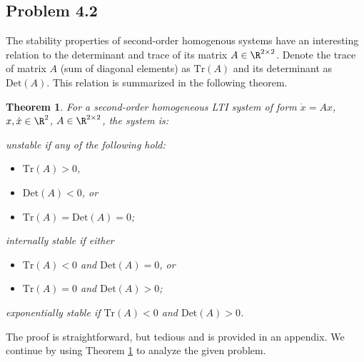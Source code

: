 \documentclass{homework}
\begin{document}
\subsection{Problem 4.2}

\newtheorem{theorem}{Theorem}
\newcommand{\Tr}{\text{Tr}(A)}
\newcommand{\Det}{\text{Det}(A)}

The stability properties of second-order homogenous systems have an interesting
relation to the determinant and trace of its matrix $A\in\R^{2\times 2}$.
Denote the trace of matrix $A$ (sum of diagonal elements) as $\Tr$ and its
determinant as $\Det$. This relation is summarized in the following theorem.

\begin{theorem}
    For a second-order homogeneous LTI system of form $\dot{x} = Ax$,
    $x,\dot{x}\in\R^2$, $A \in \R^{2\times 2}$, the system is:
    \begin{letterenum}
        \item \emph{unstable} if any of the following hold:
        \begin{itemize}
            \item $\Tr > 0$,
            \item $\Det < 0$, or
            \item $\Tr = \Det = 0$;
        \end{itemize}
        \item \emph{internally stable} if either
        \begin{itemize}
            \item $\Tr < 0$ and $\Det = 0$, or
            \item $\Tr = 0$ and $\Det > 0$;
        \end{itemize}
        \item \emph{exponentially stable} if $\Tr < 0$ and $\Det > 0$.
    \end{letterenum}
    \label{thm:1}
\end{theorem}

\noindent The proof is straightforward, but tedious and is provided in an appendix.
We continue by using Theorem \ref{thm:1} to analyze the given problem.
\end{document}

